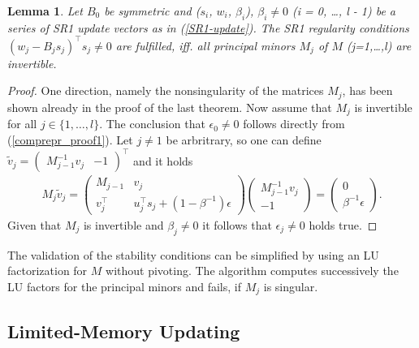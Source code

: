 \documentclass{svmult}
\newtheorem{prop}[theorem]{Lemma}
\begin{document}
\begin{prop}
Let $B_0$ be symmetric and ($s_i$, $w_i$, $\beta_i$), $\beta_i \neq 0$ (i = { 0, \ldots, l - 1}) be a series of SR1 update vectors as in (\ref{SR1-update}). The SR1 regularity conditions
$(w_j - B_j s_j)^\top s_j \neq 0$ are fulfilled, iff. all principal minors $M_j$ of $M$ (j=1,\ldots,l)
are invertible.
\end{prop}
\begin{proof}
One direction, namely the nonsingularity of the matrices $M_j$, has been shown already in the proof of the last theorem. 
Now assume that $M_j$ is invertible for all $j \in \{1, \ldots, l \}$. The conclusion
that $\epsilon_0 \neq 0$ follows directly from (\ref{comprepr_proof1}). Let $j \neq 1$ be arbritrary, so one can define $\tilde{v}_j=\begin{pmatrix} M_{j-1}^{-1} v_j & -1 \end{pmatrix}^\top $ and it holds
\begin{align}
M_j \tilde{v}_j = \begin{pmatrix}
	M_{j-1} & v_j \\
	v_j^\top & u_j^\top s_j + (1 - \beta^{-1})\epsilon
	\end{pmatrix} \begin{pmatrix}
	M_{j-1}^{-1} v_j \\
	-1
	\end{pmatrix}  =
	\begin{pmatrix}
	0 \\
	\beta^{-1} \epsilon
	\end{pmatrix} .
\end{align}
Given that $M_j$ is invertible and $\beta_j \neq 0$ it follows that $\epsilon_j \neq 0$ holds true.
\end{proof}

\noindent The validation of the stability conditions can be simplified by using an LU factorization for $M$ without pivoting. 
The algorithm computes successively the LU factors for the principal minors and fails, if $M_j$ is singular.\\



\subsection{Limited-Memory Updating}
\end{document}
